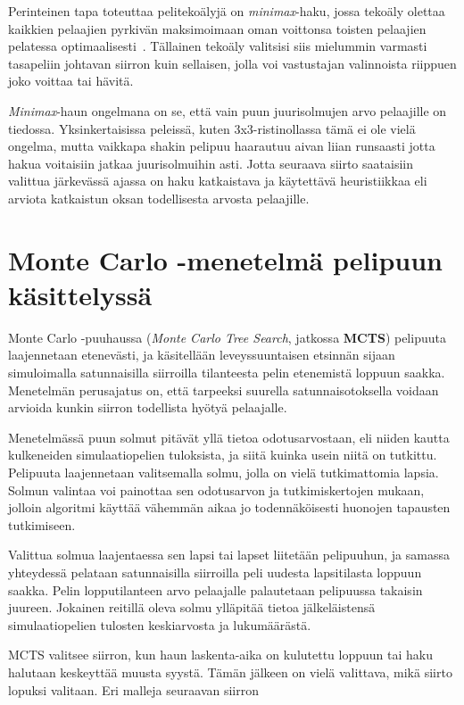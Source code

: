 \documentclass[12pt,finnish]{tktltiki2}
\theoremstyle{definition}
\theoremstyle{remark}
\begin{document}
Perinteinen tapa toteuttaa pelitekoälyjä on \textit{minimax}-haku, jossa tekoäly olettaa kaikkien pelaajien pyrkivän maksimoimaan oman voittonsa toisten pelaajien pelatessa optimaalisesti~\cite{aima}. Tällainen tekoäly valitsisi siis mielummin varmasti tasapeliin johtavan siirron kuin sellaisen, jolla voi vastustajan valinnoista riippuen joko voittaa tai hävitä.

\textit{Minimax}-haun ongelmana on se, että vain puun juurisolmujen arvo pelaajille on tiedossa. Yksinkertaisissa peleissä, kuten 3x3-ristinollassa tämä ei ole vielä ongelma, mutta vaikkapa shakin pelipuu haarautuu aivan liian runsaasti jotta hakua voitaisiin jatkaa juurisolmuihin asti. Jotta seuraava siirto saataisiin valittua järkevässä ajassa on haku katkaistava ja käytettävä heuristiikkaa eli arviota katkaistun oksan todellisesta arvosta pelaajille.~\cite{aima}


\section{Monte Carlo -menetelmä pelipuun käsittelyssä}

Monte Carlo -puuhaussa (\textit{Monte Carlo Tree Search}, jatkossa \textbf{MCTS}) pelipuuta laajennetaan etenevästi, ja käsitellään leveyssuuntaisen etsinnän sijaan simuloimalla satunnaisilla siirroilla tilanteesta pelin etenemistä loppuun saakka. Menetelmän perusajatus on, että tarpeeksi suurella satunnaisotoksella voidaan arvioida kunkin siirron todellista hyötyä pelaajalle.~\cite{browne}

Menetelmässä puun solmut pitävät yllä tietoa odotusarvostaan, eli niiden kautta kulkeneiden simulaatiopelien tuloksista, ja siitä kuinka usein niitä on tutkittu. Pelipuuta laajennetaan valitsemalla solmu, jolla on vielä tutkimattomia lapsia. Solmun valintaa voi painottaa sen odotusarvon ja tutkimiskertojen mukaan, jolloin algoritmi käyttää vähemmän aikaa jo todennäköisesti huonojen tapausten tutkimiseen.~\cite{browne}

Valittua solmua laajentaessa sen lapsi tai lapset liitetään pelipuuhun, ja samassa yhteydessä pelataan satunnaisilla siirroilla peli uudesta lapsitilasta loppuun saakka. Pelin lopputilanteen arvo pelaajalle palautetaan pelipuussa takaisin juureen. Jokainen reitillä oleva solmu ylläpitää tietoa jälkeläistensä simulaatiopelien tulosten keskiarvosta ja lukumäärästä.~\cite{browne}

MCTS valitsee siirron, kun haun laskenta-aika on kulutettu loppuun tai haku halutaan keskeyttää muusta syystä. Tämän jälkeen on vielä valittava, mikä siirto lopuksi valitaan. Eri malleja seuraavan siirron 
\end{document}

